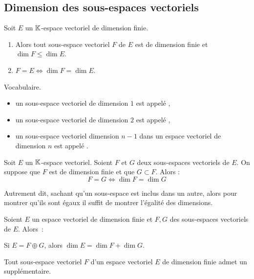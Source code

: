 \documentclass[10pt,class=article,crop=false]{standalone}
\begin{document}
\begin{multicols}{2}
\subsection{Dimension des sous-espaces vectoriels}


\begin{theoreme}
	\label{th:dimsev}
	Soit $E$ un $\mathbb{K}$-espace vectoriel de dimension finie.
	\begin{enumerate}
		\item Alors tout sous-espace vectoriel $F$ de $E$ est de dimension finie et $\dim F \le \dim E$.
	
		\item $F=E \iff \dim F = \dim E$.
	\end{enumerate}
\end{theoreme}

Vocabulaire.
\begin{itemize}
  \item un sous-espace vectoriel de dimension $1$ est
  appelé ,
  \item un sous-espace vectoriel de dimension $2$ est
  appelé ,
  \item un sous-espace vectoriel dimension $n-1$ dans un espace vectoriel de dimension $n$ est
  appelé .
\end{itemize}	

\begin{corollaire}
	Soit $E$ un $\mathbb{K}$-espace vectoriel.
	Soient $F$ et $G$ deux sous-espaces vectoriels de $E$. On suppose que $F$ est de dimension finie
	et que $G \subset F$.
	Alors :
	$$F=G \iff \dim F = \dim G$$
\end{corollaire}
Autrement dit, sachant qu'un sous-espace est inclus dans un autre, alors
pour montrer qu'ils sont égaux il suffit de montrer l'égalité des dimensions.



\begin{theoreme}
	\label{th:4dim}
	Soient $E$ un espace vectoriel de dimension finie
	et $F,G$ des sous-espaces vectoriels de $E$.
	Alors~:
\end{theoreme}

\begin{corollaire}
	Si $E = F \oplus G$, alors $\dim E = \dim F + \dim G$.
\end{corollaire}



\begin{corollaire}
Tout sous-espace vectoriel $F$ d'un espace vectoriel $E$ de dimension finie admet un supplémentaire.
\end{corollaire}



\end{multicols}
\end{document}
